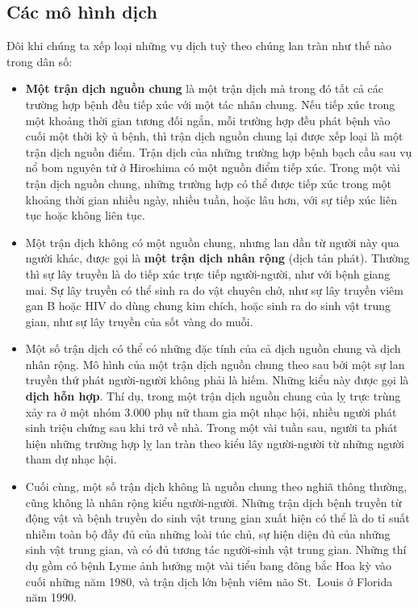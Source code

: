 \documentclass[
]{book}
\begin{document}
\hypertarget{cuxe1c-muxf4-huxecnh-dux1ecbch}{%
\subsection{Các mô hình dịch}\label{cuxe1c-muxf4-huxecnh-dux1ecbch}}

Đôi khi chúng ta xếp loại những vụ dịch tuỳ theo chúng lan tràn như thế nào trong dân số:

\begin{itemize}
\item
  \textbf{Một trận dịch nguồn chung} là một trận dịch mà trong đó tất cả các trường hợp bệnh đều tiếp xúc với một tác nhân chung. Nếu tiếp xúc trong một khoảng thời gian tương đối ngắn, mỗi trường hợp đều phát bệnh vào cuối một thời kỳ ủ bệnh, thì trận dịch nguồn chung lại được xếp loại là một trận dịch nguồn điểm. Trận dịch của những trường hợp bệnh bạch cầu sau vụ nổ bom nguyên tử ở Hiroshima có một nguồn điểm tiếp xúc. Trong một vài trận dịch nguồn chung, những trường hợp có thể được tiếp xúc trong một khoảng thời gian nhiều ngày, nhiều tuần, hoặc lâu hơn, với sự tiếp xúc liên tục hoặc không liên tục.
\item
  Một trận dịch không có một nguồn chung, nhưng lan dần từ người này qua người khác, được gọi là \textbf{một trận dịch nhân rộng} (dịch tản phát). Thường thì sự lây truyền là do tiếp xúc trực tiếp người-người, như với bệnh giang mai. Sự lây truyền có thể sinh ra do vật chuyên chở, như sự lây truyền viêm gan B hoặc HIV do dùng chung kim chích, hoặc sinh ra do sinh vật trung gian, như sự lây truyền của sốt vàng do muỗi.
\item
  Một số trận dịch có thể có những đặc tính của cả dịch nguồn chung và dịch nhân rộng. Mô hình của một trận dịch nguồn chung theo sau bởi một sự lan truyền thứ phát người-người không phải là hiếm. Những kiểu này được gọi là \textbf{dịch hỗn hợp}. Thí dụ, trong một trận dịch nguồn chung của lỵ trực trùng xảy ra ở một nhóm 3.000 phụ nữ tham gia một nhạc hội, nhiều người phát sinh triệu chứng sau khi trở về nhà. Trong một vài tuần sau, người ta phát hiện những trường hợp lỵ lan tràn theo kiểu lây người-người từ những người tham dự nhạc hội.
\item
  Cuối cùng, một số trận dịch không là nguồn chung theo nghiã thông thường, cũng không là nhân rộng kiểu người-người. Những trận dịch bệnh truyền từ động vật và bệnh truyền do sinh vật trung gian xuất hiện có thể là do tỉ suất nhiễm toàn bộ đầy đủ của những loài túc chủ, sự hiện diện đủ của những sinh vật trung gian, và có đủ tương tác người-sinh vật trung gian. Những thí dụ gồm có bệnh Lyme ảnh hưởng một vài tiểu bang đông bắc Hoa kỳ vào cuối những năm 1980, và trận dịch lớn bệnh viêm não St.~Louis ở Florida năm 1990.
\end{itemize}
\end{document}
